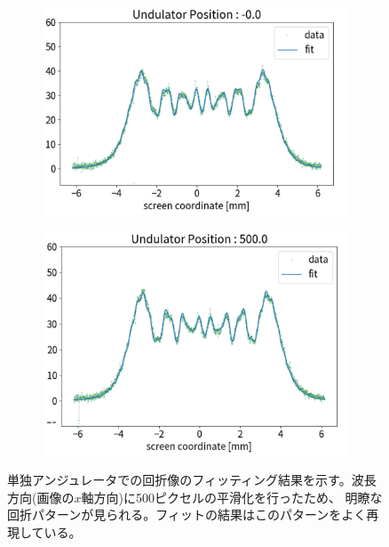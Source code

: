 \documentclass[a4paper,11pt,uplatex]{jsbook}
\begin{document}
\begin{figure}[H]
  \centering
  \begin{subfigure}[h]{0.45\linewidth}
    \centering
    \includegraphics[width=\linewidth]{image/4-single_0.png}
  \end{subfigure}
  \hfill
  \begin{subfigure}[h]{0.45\linewidth}
    \centering
    \includegraphics[width=\linewidth]{image/4-single_500.png}
  \end{subfigure}
  \caption[単独アンジュレータのデータ]{単独アンジュレータでの回折像のフィッティング結果を示す。波長方向(画像の$x$軸方向)に500ピクセルの平滑化を行ったため、
  明瞭な回折パターンが見られる。フィットの結果はこのパターンをよく再現している。}\label{single_d}
\end{figure}
\end{document}

